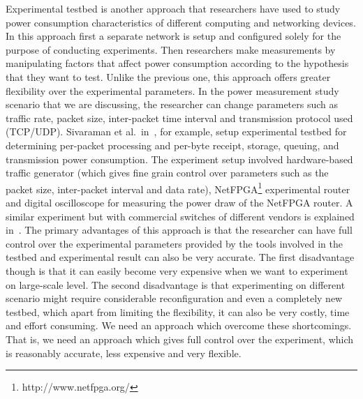 Experimental testbed is another approach that researchers have used to study power consumption characteristics of different computing and networking devices. In this approach first a separate network is setup and configured solely for the purpose of conducting experiments. Then researchers make measurements by manipulating factors that affect power consumption according to the hypothesis that they want to test. Unlike the previous one, this approach offers greater flexibility over the experimental parameters. In the power measurement study scenario that we are discussing, the researcher can change parameters such as traffic rate, packet size, inter-packet time interval and transmission protocol used (TCP/UDP). Sivaraman et al.~in~\cite{Sivaraman}, for example, setup experimental testbed for determining per-packet processing and per-byte receipt, storage, queuing, and transmission power consumption. The experiment setup involved hardware-based traffic generator (which gives fine grain control over parameters such as the packet size, inter-packet interval and data rate), NetFPGA\footnote{http://www.netfpga.org/} experimental router and digital oscilloscope for measuring the power draw of the NetFPGA router. A similar experiment but with commercial switches of different vendors is explained in~\cite{DBLP:journals/comcom/SivaramanRZSVMR14}. The primary advantages of this approach is that the researcher can have full control over the experimental parameters provided by the tools involved in the testbed and experimental result can also be very accurate. The first disadvantage though is that it can easily become very expensive when we want to experiment on large-scale level. The second disadvantage is that experimenting on different scenario might require considerable reconfiguration and even a completely new testbed, which apart from limiting the flexibility, it can also be very costly, time and effort consuming. We need an approach which overcome these shortcomings. That is, we need an approach which gives full control over the experiment, which is reasonably accurate, less expensive and very flexible. 


